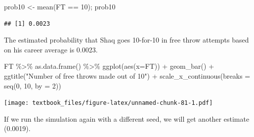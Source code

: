 \documentclass[
  11pt,
]{book}
\newenvironment{Shaded}{\begin{snugshade}}{\end{snugshade}}
\newcommand{\AttributeTok}[1]{\textcolor[rgb]{0.77,0.63,0.00}{#1}}
\newcommand{\DecValTok}[1]{\textcolor[rgb]{0.00,0.00,0.81}{#1}}
\newcommand{\FunctionTok}[1]{\textcolor[rgb]{0.00,0.00,0.00}{#1}}
\newcommand{\NormalTok}[1]{#1}
\newcommand{\OtherTok}[1]{\textcolor[rgb]{0.56,0.35,0.01}{#1}}
\newcommand{\SpecialCharTok}[1]{\textcolor[rgb]{0.00,0.00,0.00}{#1}}
\newcommand{\StringTok}[1]{\textcolor[rgb]{0.31,0.60,0.02}{#1}}
\theoremstyle{definition}
\theoremstyle{definition}
\theoremstyle{definition}
\theoremstyle{definition}
\theoremstyle{remark}
\begin{document}
\begin{Shaded}
\begin{Highlighting}[]
\NormalTok{prob10 }\OtherTok{\textless{}{-}} \FunctionTok{mean}\NormalTok{(FT }\SpecialCharTok{==} \DecValTok{10}\NormalTok{); prob10}
\end{Highlighting}
\end{Shaded}

\begin{verbatim}
## [1] 0.0023
\end{verbatim}

The estimated probability that Shaq goes 10-for-10 in free throw attempts based on his career average is 0.0023.

\vfill
\newpage

\begin{Shaded}
\begin{Highlighting}[]
\NormalTok{FT }\SpecialCharTok{\%\textgreater{}\%} 
  \FunctionTok{as.data.frame}\NormalTok{() }\SpecialCharTok{\%\textgreater{}\%} 
  \FunctionTok{ggplot}\NormalTok{(}\FunctionTok{aes}\NormalTok{(}\AttributeTok{x=}\NormalTok{FT)) }\SpecialCharTok{+} 
  \FunctionTok{geom\_bar}\NormalTok{() }\SpecialCharTok{+}
  \FunctionTok{ggtitle}\NormalTok{(}\StringTok{"Number of free throws made out of 10"}\NormalTok{) }\SpecialCharTok{+} 
  \FunctionTok{scale\_x\_continuous}\NormalTok{(}\AttributeTok{breaks =} \FunctionTok{seq}\NormalTok{(}\DecValTok{0}\NormalTok{, }\DecValTok{10}\NormalTok{, }\AttributeTok{by =} \DecValTok{2}\NormalTok{))}
\end{Highlighting}
\end{Shaded}

\texttt{[image: textbook\_files/figure-latex/unnamed-chunk-81-1.pdf]}

\vfill
\newpage

If we run the simulation again with a different seed, we will get another estimate (0.0019).
\end{document}

